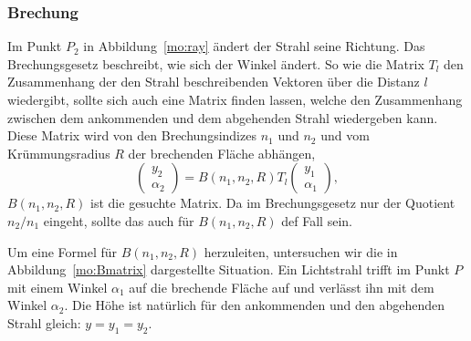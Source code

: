 \subsubsection{Brechung}
Im Punkt $P_2$ in Abbildung~\ref{mo:ray} ändert der Strahl seine
Richtung.
Das Brechungsgesetz beschreibt, wie sich der Winkel ändert.
So wie die Matrix $T_l$ den Zusammenhang der den Strahl beschreibenden
Vektoren über die Distanz $l$ wiedergibt, sollte sich auch eine
Matrix finden lassen, welche den Zusammenhang zwischen dem ankommenden
und dem abgehenden Strahl wiedergeben kann.
Diese Matrix wird von den Brechungsindizes $n_1$ und $n_2$ und vom
Krümmungsradius $R$ der brechenden Fläche abhängen, 
\[
\begin{pmatrix}
y_2\\\alpha_2
\end{pmatrix}
=
B(n_1,n_2,R)
T_l
\begin{pmatrix}
y_1 \\ \alpha_1
\end{pmatrix},
\]
$B(n_1,n_2,R)$ ist die gesuchte Matrix.
Da im Brechungsgesetz nur der Quotient $n_2/n_1$ eingeht, sollte das
auch für $B(n_1,n_2,R)$ def Fall sein.

Um eine Formel für $B(n_1,n_2,R)$ herzuleiten, untersuchen wir die
in Abbildung~\ref{mo:Bmatrix} dargestellte Situation.
Ein Lichtstrahl trifft im Punkt $P$ mit einem Winkel $\alpha_1$
auf die brechende Fläche auf und verlässt ihn mit dem Winkel $\alpha_2$.
Die Höhe ist natürlich für den ankommenden und den abgehenden Strahl
gleich: $y=y_1=y_2$.

